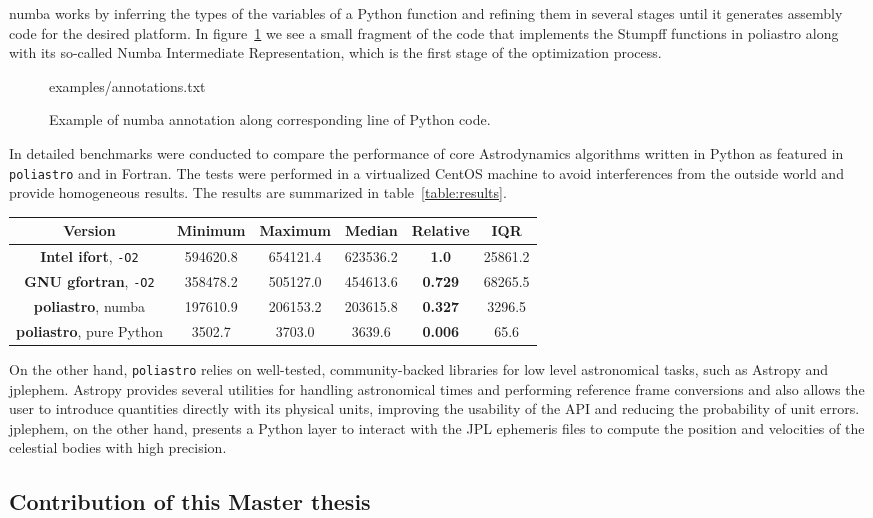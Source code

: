 numba works by inferring the types of the variables of a Python function and refining them in several stages until it generates assembly code for the desired platform. In figure~\ref{fig:numba} we see a small fragment of the code that implements the Stumpff functions in poliastro along with its so-called Numba Intermediate Representation, which is the first stage of the optimization process.

\begin{figure}
\begin{lstinputlisting}[language=Python]{examples/annotations.txt}
\end{lstinputlisting}
\caption{Example of numba annotation along corresponding line of Python code.}
\label{fig:numba}
\end{figure}

In \cite{cano2017icatt} detailed benchmarks were conducted to compare the performance of core Astrodynamics algorithms written in Python as featured in \verb|poliastro| and in Fortran. The tests were performed in a virtualized CentOS machine to avoid interferences from the outside world and provide homogeneous results. The results are summarized in table~\ref{table:results}.

\begin{table*}
    \centering
    \begin{tabular}{ c|c c c c c }
          \textbf{Version} & \textbf{Minimum} & \textbf{Maximum} & \textbf{Median} & \textbf{Relative} & \textbf{IQR} \\
    \hline
        \textbf{Intel ifort}, \verb|-O2| & 594620.8 & 654121.4 & 623536.2 & \textbf{1.0} & 25861.2 \\ 
        \textbf{GNU gfortran}, \verb|-O2| & 358478.2 & 505127.0 & 454613.6 & \textbf{0.729} & 68265.5 \\ 
        \textbf{poliastro}, numba & 197610.9 & 206153.2 & 203615.8 & \textbf{0.327} & 3296.5 \\ 
        \textbf{poliastro}, pure Python & 3502.7 & 3703.0 & 3639.6 & \textbf{0.006} & 65.6 \\ 
    \end{tabular}
    \caption{Benchmarking results}
    \label{table:results}
\end{table*}

On the other hand, \verb|poliastro| relies on well-tested, community-backed libraries for low level astronomical tasks, such as Astropy\cite{robitaille2013astropy} and jplephem. Astropy provides several utilities for handling astronomical times and performing reference frame conversions and also allows the user to introduce quantities directly with its physical units, improving the usability of the API and reducing the probability of unit errors. jplephem, on the other hand, presents a Python layer to interact with the JPL ephemeris files to compute the position and velocities of the celestial bodies with high precision.

\subsection{Contribution of this Master thesis}

\clearpage